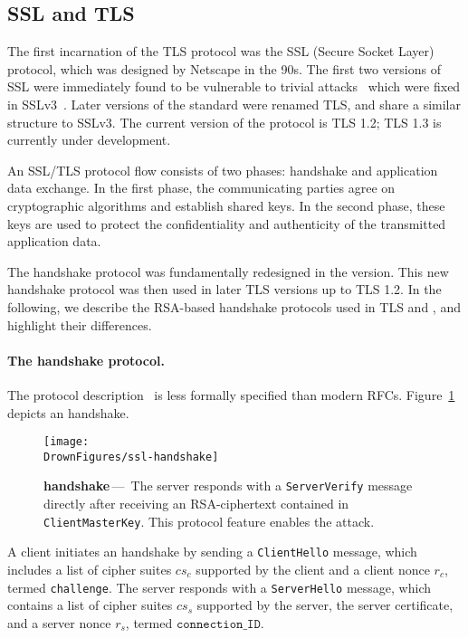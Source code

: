 \subsection{SSL and TLS}
The first incarnation of the TLS protocol was the SSL (Secure Socket Layer)
protocol, which was designed by Netscape in the 90s. The first two versions
of SSL were immediately found to be vulnerable to trivial
attacks~\cite{rfc6176,ssl-v3-1996} which were fixed in SSLv3~\cite{rfc6101}.
Later versions of the standard were renamed TLS, and share a similar
structure to SSLv3. The current version of the protocol is TLS 1.2; TLS 1.3
is currently under development.

An SSL/TLS protocol flow consists of two phases: handshake and
application data exchange. In the first phase, the communicating
parties agree on cryptographic algorithms and establish shared
keys. In the second phase, these keys are used to protect the
confidentiality and authenticity of the transmitted application data.

The handshake protocol was fundamentally redesigned in the \sslthree
version. This new handshake protocol was then used in later TLS
versions up to TLS 1.2. In the following, we describe the RSA-based
handshake protocols used in TLS and \ssltwo, and highlight their
differences.

\paragraph{The \ssltwo handshake protocol.}
\label{sec:ssl2}

The \ssltwo protocol description~\cite{sslv2} is less formally specified than
modern RFCs. Figure~\ref{fig:ssl-handshake} depicts an \ssltwo handshake.

\begin{figure}
	\texttt{[image: \\DrownFigures/ssl-handshake]} 
	\caption{\textbf{\ssltwo handshake}\,---\,%
	The server responds with a \texttt{ServerVerify} message directly after
    receiving an RSA-\PKCS ciphertext contained in \texttt{ClientMasterKey}.
	This protocol feature enables the attack.
	}
	\label{fig:ssl-handshake}
\end{figure}

A client initiates an \ssltwo handshake by sending a
\texttt{ClientHello} message, which includes a list of cipher
suites $cs_c$ supported by the client and a client nonce $r_c$,
termed \texttt{challenge}.
The server responds with a \texttt{ServerHello} message, which
contains a list of cipher suites $cs_s$ supported by the server,
the server certificate, and a server nonce $r_s$, termed
$\texttt{connection\_ID}$.

